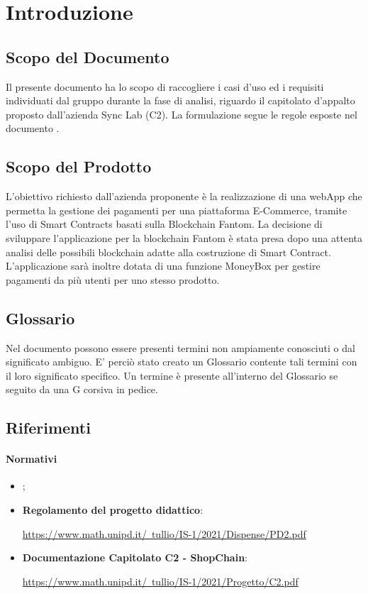 \section{Introduzione} \label{section:introduzione}

\subsection{Scopo del Documento}
Il presente documento ha lo scopo di raccogliere i casi d'uso ed i requisiti individuati dal gruppo
durante la fase di analisi, riguardo il capitolato d'appalto proposto dall'azienda Sync Lab (C2).
La formulazione segue le regole esposte nel documento \docNameNdP{}.

\subsection{Scopo del Prodotto}
L'obiettivo richiesto dall'azienda proponente è la realizzazione di una webApp\glo{} che permetta la gestione dei pagamenti per una piattaforma E-Commerce, tramite l'uso di Smart Contracts\glo{} basati sulla Blockchain\glo{} Fantom\glo{}.
La decisione di sviluppare l'applicazione per la blockchain Fantom è stata presa dopo una attenta analisi delle possibili blockchain adatte alla costruzione di Smart Contract.
L'applicazione sarà inoltre dotata di una funzione MoneyBox\glo{} per gestire pagamenti da più utenti per uno stesso prodotto.

\subsection{Glossario}
Nel documento possono essere presenti termini non ampiamente conosciuti o dal significato ambiguo. E' perciò stato creato
un Glossario contente tali termini con il loro significato specifico. Un termine è presente
all'interno del Glossario se seguito da una G corsiva in pedice.

\subsection{Riferimenti}

\paragraph{Normativi}
\begin{itemize}
    \item \textbf{\docNameVersionNdP{}};
    \item \textbf{Regolamento del progetto didattico}:
    \begin{center}
        \href{https://www.math.unipd.it/~tullio/IS-1/2021/Dispense/PD2.pdf}{https://www.math.unipd.it/~tullio/IS-1/2021/Dispense/PD2.pdf}
    \end{center}
    \item \textbf{Documentazione Capitolato C2 - ShopChain}:
    \begin{center}
        \href{https://www.math.unipd.it/~tullio/IS-1/2021/Progetto/C2.pdf}{https://www.math.unipd.it/~tullio/IS-1/2021/Progetto/C2.pdf}
    \end{center}
\end{itemize}

